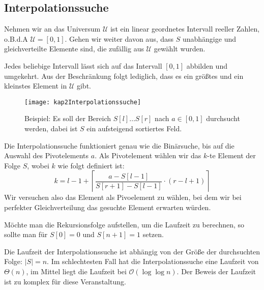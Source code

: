 \subsection{Interpolationssuche}
Nehmen wir an das Universum $\mathcal{U}$ ist ein linear geordnetes Intervall reeller Zahlen, o.B.d.A $\mathcal{U}=[0,1]$. Gehen wir weiter davon aus, dass $S$ unabhängige und gleichverteilte Elemente sind, die zufällig aus $\mathcal{U}$ gewählt wurden.

\begin{Bem}
\hspace{\parindent}Jedes beliebige Intervall lässt sich auf das Intervall $[0,1]$ abbilden und umgekehrt. Aus der Beschränkung folgt lediglich, dass es ein größtes und ein kleinstes Element in $\mathcal{U}$ gibt.\end{Bem}

\begin{figure}[htb]
  \centering
  \texttt{[image: kap2Interpolationssuche]}
  \caption{Beispiel: Es soll der Bereich $S[l] \ldots S[r]$ nach $a \in [0,1]$ durchsucht werden, dabei ist $S$ ein aufsteigend sortiertes Feld.}
  \label{interpolationssuche}
\end{figure}

Die Interpolationssuche funktioniert genau wie die Binärsuche, bis auf die Auswahl des Pivotelements $a$. Als Pivotelement wählen wir das $k$-te Element der Folge $S$, wobei $k$ wie folgt definiert ist:
\[ k=l-1 + \left\lceil \frac{a-S[l-1]}{S[r+1]-S[l-1]} \cdot (r-l+1) \right\rceil \]
Wir versuchen also das Element als Pivoelement zu wählen, bei dem wir bei perfekter Gleichverteilung das gesuchte Element erwarten würden.



Möchte man die Rekursionsfolge aufstellen, um die Laufzeit zu berechnen, so sollte man für $S[0] = 0$ und $S[n+1] = 1$ setzen.

Die Laufzeit der Interpolationssuche ist abhängig von der Größe der durchsuchten Folge: $|S|=n$. Im schlechtesten Fall hat die Interpolationssuche eine Laufzeit von $\Theta(n)$, im Mittel liegt die Laufzeit bei $\mathcal{O}(\log\log n)$. Der Beweis der Laufzeit ist zu komplex für diese Veranstaltung.

